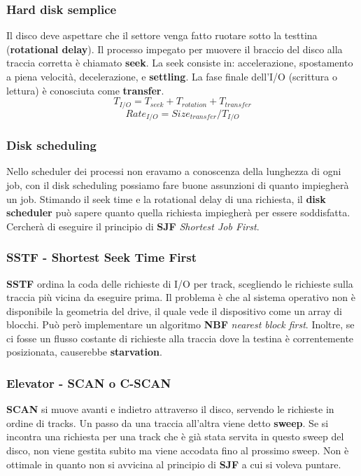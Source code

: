\documentclass[12pt, letterpaper]{article}
\begin{document}
			\subsubsection{Hard disk semplice}
				Il disco deve aspettare che il settore venga fatto ruotare sotto la testtina (\textbf{rotational delay}). Il processo impegato per muovere il braccio del disco alla traccia corretta è chiamato \textbf{seek}. La seek consiste in: accelerazione, spostamento a piena velocità, decelerazione, e \textbf{settling}. La fase finale dell'I/O (scrittura o lettura) è conosciuta come \textbf{transfer}. 
				$$T_{I/O} = T_{seek} + T_{rotation} + T_{transfer}$$
				$$Rate_{I/O} = Size_{transfer} / T_{I/O}$$
				
			\subsubsection{Disk scheduling}
				Nello scheduler dei processi non eravamo a conoscenza della lunghezza di ogni job, con il disk scheduling possiamo fare buone assunzioni di quanto impiegherà un job. Stimando il seek time e la rotational delay di una richiesta, il \textbf{disk scheduler} può sapere quanto quella richiesta impiegherà per essere soddisfatta. Cercherà di eseguire il principio di \textbf{SJF} \textit{Shortest Job First}.
				
			\subsubsection{SSTF - Shortest Seek Time First}
				\textbf{SSTF} ordina la coda delle richieste di I/O per track, scegliendo le richieste sulla traccia più vicina da eseguire prima. Il problema è che al sistema operativo non è disponibile la geometria del drive, il quale vede il dispositivo come un array di blocchi. Può però implementare un algoritmo \textbf{NBF} \textit{nearest block first}. Inoltre, se ci fosse un flusso costante di richieste alla traccia dove la testina è correntemente posizionata, causerebbe \textbf{starvation}.
				
			\subsubsection{Elevator - SCAN o C-SCAN}
				\textbf{SCAN} si muove avanti e indietro attraverso il disco, servendo le richieste in ordine di tracks. Un passo da una traccia all'altra viene detto \textbf{sweep}. Se si incontra una richiesta per una track che è già stata servita in questo sweep del disco, non viene gestita subito ma viene accodata fino al prossimo sweep. Non è ottimale in quanto non si avvicina al principio di \textbf{SJF} a cui si voleva puntare.
				
\end{document}
